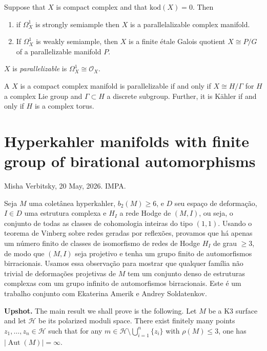 \begin{theorem}[E-M]
\label{theorem-em}
Suppose that $X$ is compact complex and that
$\text{kod}(X)=0$. Then
\begin{enumerate}
\item if $\Omega_X^1$ is strongly semiample
then
$X$ is a parallelalizable complex manifold.
\item If $\Omega_X^1$ is weakly semiample,
then $X$ is a finite étale Galois quotient
$X\cong P/G$
of a parallelizable manifold $P$.
\end{enumerate}
\end{theorem}

\begin{definition}
\label{definition-paralellizable}
$X$ is {\it parallelizable} is
$\Omega_X^1\cong\mathcal{O}_X$.
\end{definition}

\noindent
A $X$ is a compact complex manifold is
parallelizable if and only if
$X \cong H/\Gamma$ for $H$ a complex Lie
group and $\Gamma\subset H$
a discrete subgroup.
Further, it is Kähler if and only if $H$ is a
complex torus.

\section{Hyperkahler manifolds with 
finite group of birational automorphisms}
\label{section-hk-misha-26}

\noindent
Misha Verbitsky, 20 May, 2026. IMPA.

\medskip{} Seja $M$ uma
coletânea hyperkahler, $b_2(M)\ge 6$, e $D$ seu
espaço de deformação, $I\in D$ uma estrutura
complexa e $H_I$ a rede Hodge de $(M,I)$, ou seja,
o conjunto de todas as classes de cohomologia
inteiras do tipo $(1,1)$. Usando o teorema de
Vinberg sobre redes geradas por reflexões,
provamos que há apenas um número finito de
classes de isomorfismo de redes de Hodge $H_I$
de grau $\ge 3$, de modo que $(M,I)$ seja projetivo
e tenha um grupo finito de automorfismos
birracionais. Usamos essa observação para
mostrar que qualquer família não trivial de
deformações projetivas de $M$ tem um conjunto
denso de estruturas complexas com um grupo
infinito de automorfismos birracionais. Este
é um trabalho conjunto com Ekaterina Amerik e
Andrey Soldatenkov.  


\medskip\noindent
{\bf Upshot.}
The main result we shall prove is the
following.
Let $M$ be a K3 surface and let $\mathcal{H}$
be its polarized moduli space.
There exist finitely many points
$z_1,\dots,z_n \in \mathcal{H}$
such that for any
$m \in \mathcal{H}\setminus \bigcup_{i=1}^n \{z_i\}$
with $\rho(M)\leq 3$, one has
$\lvert \operatorname{Aut}(M)\rvert=\infty$.

